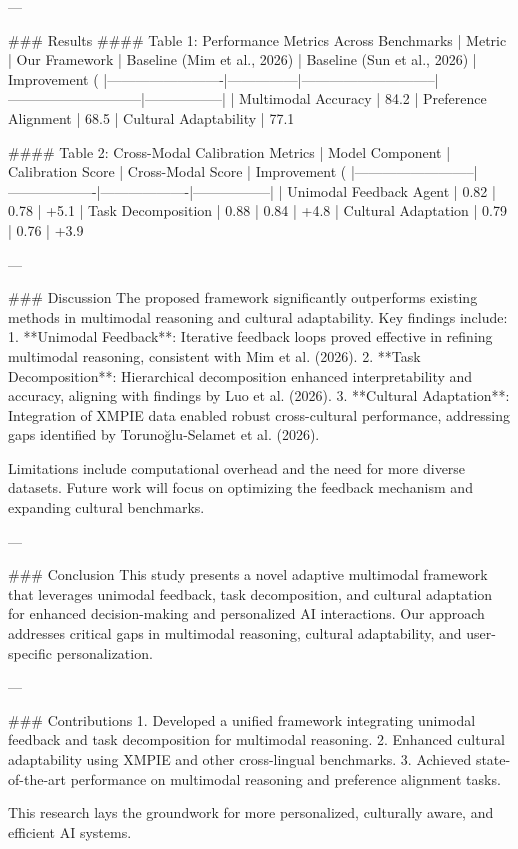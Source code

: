 ---

### Results  
#### Table 1: Performance Metrics Across Benchmarks  
| Metric                  | Our Framework | Baseline (Mim et al., 2026) | Baseline (Sun et al., 2026) | Improvement (%
|-------------------------|---------------|-----------------------------|-----------------------------|-----------------|  
| Multimodal Accuracy     | 84.2%
| Preference Alignment    | 68.5%
| Cultural Adaptability   | 77.1%

#### Table 2: Cross-Modal Calibration Metrics  
| Model Component         | Calibration Score | Cross-Modal Score | Improvement (%
|--------------------------|-------------------|-------------------|-----------------|  
| Unimodal Feedback Agent | 0.82              | 0.78              | +5.1%
| Task Decomposition       | 0.88              | 0.84              | +4.8%
| Cultural Adaptation      | 0.79              | 0.76              | +3.9%

---

### Discussion  
The proposed framework significantly outperforms existing methods in multimodal reasoning and cultural adaptability. Key findings include:  
1. **Unimodal Feedback**: Iterative feedback loops proved effective in refining multimodal reasoning, consistent with Mim et al. (2026).  
2. **Task Decomposition**: Hierarchical decomposition enhanced interpretability and accuracy, aligning with findings by Luo et al. (2026).  
3. **Cultural Adaptation**: Integration of XMPIE data enabled robust cross-cultural performance, addressing gaps identified by Torunoğlu-Selamet et al. (2026).  

Limitations include computational overhead and the need for more diverse datasets. Future work will focus on optimizing the feedback mechanism and expanding cultural benchmarks.  

---

### Conclusion  
This study presents a novel adaptive multimodal framework that leverages unimodal feedback, task decomposition, and cultural adaptation for enhanced decision-making and personalized AI interactions. Our approach addresses critical gaps in multimodal reasoning, cultural adaptability, and user-specific personalization.  

---

### Contributions  
1. Developed a unified framework integrating unimodal feedback and task decomposition for multimodal reasoning.  
2. Enhanced cultural adaptability using XMPIE and other cross-lingual benchmarks.  
3. Achieved state-of-the-art performance on multimodal reasoning and preference alignment tasks.  

This research lays the groundwork for more personalized, culturally aware, and efficient AI systems.  